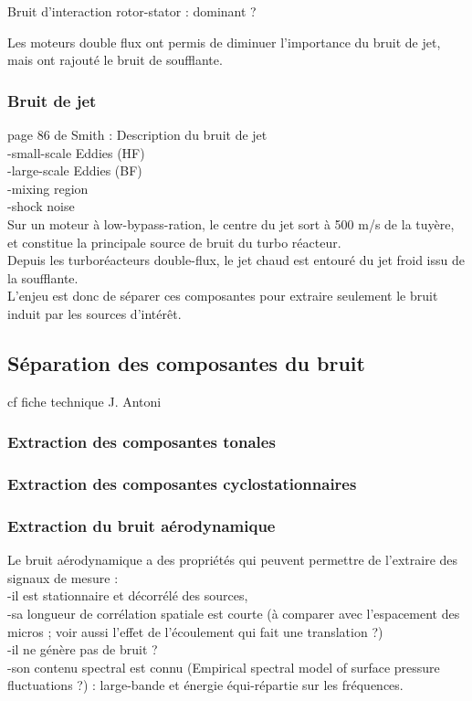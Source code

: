 Bruit d'interaction rotor-stator : dominant ?\\

Les moteurs double flux ont permis de diminuer l'importance du bruit de jet, mais ont rajouté le bruit de soufflante.


\subsubsection{Bruit de jet}

page 86 de Smith : Description du bruit de jet\\
-small-scale Eddies (HF)\\
-large-scale Eddies (BF)\\
-mixing region\\
-shock noise\\
Sur un moteur à low-bypass-ration, le centre du jet sort à 500 m/s de la tuyère, et constitue la principale source de bruit du turbo réacteur.\\
Depuis les turboréacteurs double-flux, le jet chaud est entouré du jet froid issu de la soufflante.\\


L'enjeu est donc de séparer ces composantes pour extraire seulement le bruit induit par les sources d'intérêt.


\subsection{Séparation des composantes du bruit}
cf fiche technique J. Antoni

\subsubsection{Extraction des composantes tonales}


\subsubsection{Extraction des composantes cyclostationnaires}


\subsubsection{Extraction du bruit aérodynamique}

Le bruit aérodynamique a des propriétés qui peuvent permettre de l'extraire des signaux de mesure : \\
-il est stationnaire et décorrélé des sources,\\
-sa longueur de corrélation spatiale est courte (à comparer avec l'espacement des micros ; voir aussi l'effet de l'écoulement qui fait une translation ?) \\
-il ne génère pas de bruit ?\\
-son contenu spectral est connu (Empirical spectral model of surface pressure fluctuations ?) : large-bande et énergie équi-répartie sur les fréquences.\\

